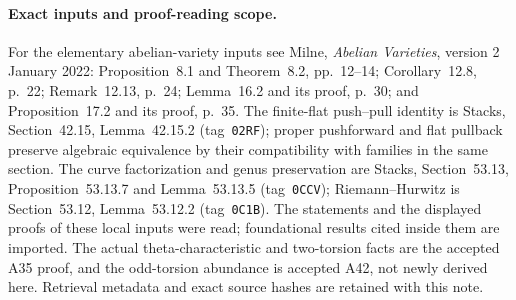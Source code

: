 \paragraph{Exact inputs and proof-reading scope.}
For the elementary abelian-variety inputs see Milne,
\emph{Abelian Varieties}, version 2 January 2022:
Proposition~8.1 and Theorem~8.2, pp.~12--14;
Corollary~12.8, p.~22; Remark~12.13, p.~24;
Lemma~16.2 and its proof, p.~30; and Proposition~17.2 and
its proof, p.~35.  The finite-flat push--pull identity is
Stacks, Section~42.15, Lemma~42.15.2 (tag~\texttt{02RF});
proper pushforward and flat pullback preserve algebraic
equivalence by their compatibility with families in the same
section.  The curve factorization and genus preservation are
Stacks, Section~53.13, Proposition~53.13.7 and
Lemma~53.13.5 (tag~\texttt{0CCV}); Riemann--Hurwitz is
Section~53.12, Lemma~53.12.2 (tag~\texttt{0C1B}).
The statements and the displayed proofs of these local inputs
were read; foundational results cited inside them are imported.
The actual theta-characteristic and two-torsion facts are the
accepted A35 proof, and the odd-torsion abundance is accepted
A42, not newly derived here.  Retrieval metadata and exact
source hashes are retained with this note.
